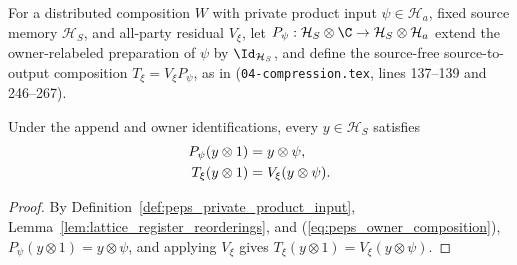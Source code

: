 \begin{definition}
    \label{def:peps_actual_private_preparation}
    \leanok
    For a distributed composition $W$ with private product input
    $\psi\in\mathcal H_a$, fixed source memory $\mathcal H_S$, and all-party
    residual $V_\xi$, let $P_\psi:\mathcal H_S\otimes\C\to\mathcal H_S\otimes\mathcal H_a$
    extend the owner-relabeled preparation of $\psi$ by $\Id_{\mathcal H_S}$,
    and define the source-free source-to-output composition $T_\xi=V_\xi P_\psi$,
    as in \cite[proof of Theorem~5.2]{OpenAI2026PolynomialPEPS}
    (\texttt{04-compression.tex}, lines 137--139 and 246--267).
\end{definition}

\begin{lemma}
    \label{thm:peps_actual_private_preparation}
    \leanok
    Under the append and owner identifications, every $y\in\mathcal H_S$
    satisfies
    \begin{align}
        P_\psi(y\otimes1) & =y\otimes\psi,
        \label{eq:peps_actual_private_preparation}      \\
        T_\xi(y\otimes1)  & =V_\xi(y\otimes\psi).\notag
    \end{align}
\end{lemma}

\begin{proof}\leanok
    By Definition~\ref{def:peps_private_product_input},
    Lemma~\ref{lem:lattice_register_reorderings}, and
    (\ref{eq:peps_owner_composition}), $P_\psi(y\otimes 1)=y\otimes\psi$, and
    applying $V_\xi$ gives $T_\xi(y\otimes 1)=V_\xi(y\otimes\psi)$.
\end{proof}
